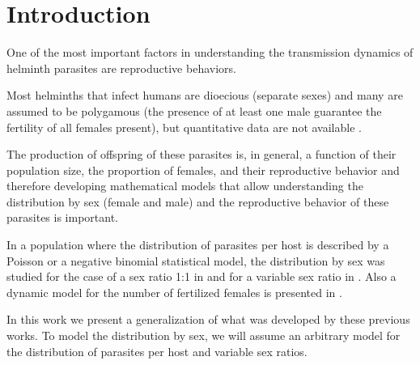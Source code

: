 \documentclass[bimj,fleqn]{w-art}
\theoremstyle{plain}
\theoremstyle{definition}
\begin{document}
\maketitle                   %







\section{Introduction}
\label{s:intro}

One of the most important factors in understanding the transmission dynamics of helminth parasites are reproductive behaviors.

Most helminths that infect humans are dioecious (separate sexes) and many are assumed to be polygamous (the presence of at least one male guarantee the fertility of all females present), but quantitative data are not available \cite{anderson1992infectious}.

The production of offspring of these parasites is, in general, a function of their population size, the proportion of females, and their reproductive behavior and therefore
developing mathematical models that allow understanding the distribution by sex (female and male) and the reproductive behavior of these parasites is important.


In a population where the distribution of parasites per host is described by a Poisson or a negative binomial statistical model, the distribution by sex was studied for the case of a sex ratio 1:1 in \cite{may1977togetherness} and for a variable sex ratio in \cite{may1993biased}.
Also a dynamic model for the number of fertilized females is presented in \cite{leyton1968stochastic}.


In this work we present a generalization of what was developed by these previous works.
To model the distribution by sex, we will assume an arbitrary model for the distribution of parasites per host and variable sex ratios. 
\end{document}

